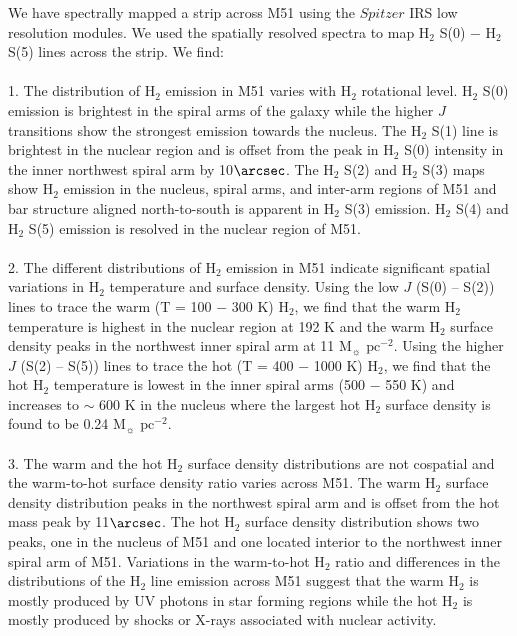 \documentclass[12pt,preprint]{aastex}
\begin{document}
We have spectrally mapped a strip across M51 using the $Spitzer$ IRS
low resolution modules.  We used the spatially resolved spectra to map
H$_2$ S(0) $-$ H$_2$ S(5) lines across
the strip.  We find:\\
\\
1.  The distribution of H$_2$
emission in M51 varies with H$_2$ rotational level.
H$_2$ S(0) emission is brightest in the spiral arms of the
galaxy while the higher $J$ transitions show the strongest emission
towards the nucleus.  The H$_2$ S(1) line is brightest
in the nuclear region and is offset from the peak in H$_2$ S(0) 
intensity in the inner northwest spiral arm by 10$\arcsec$.
The H$_2$ S(2) and H$_2$ S(3) maps show
H$_2$ emission in the nucleus, spiral arms, and inter-arm
regions of M51 and bar structure aligned north-to-south is apparent in
H$_2$ S(3) emission.  H$_2$ S(4) and H$_2$
S(5) emission is resolved in the nuclear region of M51.\\
\\
2.  The different distributions of H$_2$ emission in M51
indicate significant spatial variations in H$_2$
temperature and surface density.  Using the low $J$ (S(0) -- S(2)) lines to trace the warm (T = 100
$-$ 300 K) H$_2$, we find that the warm H$_2$
temperature is highest in the nuclear region at 192 K and
the warm H$_2$ surface density peaks in the northwest inner spiral arm
at 11 $\mathrm{M_\sun}$ $\mathrm{pc^{-2}}$.  Using the
higher $J$ (S(2) -- S(5)) lines to trace the hot (T = 400 $-$ 1000 K) H$_2$,
we find that the hot H$_2$ temperature is lowest
in the inner spiral arms (500 $-$ 550 K) and increases to $\sim$ 600 K
in the nucleus where the largest hot H$_2$ surface density
is found to be 0.24 $\mathrm{M_\sun}$ $\mathrm{pc^{-2}}$.\\
\\
3.  The warm and the hot H$_2$ surface density distributions are not
cospatial and the warm-to-hot surface density ratio varies across M51.  The warm
H$_2$ surface density distribution peaks in the northwest spiral arm and is offset from
the hot mass peak by 11$\arcsec$.  The hot H$_2$ surface density distribution 
shows two peaks, one in the nucleus of M51 and one located interior to the 
northwest inner spiral arm of M51.  Variations in the
warm-to-hot H$_2$ ratio and differences in the
distributions of the H$_2$ line emission across 
M51 suggest that the warm H$_2$ is mostly produced 
by UV photons in star forming regions while the hot H$_2$ is 
mostly produced by shocks or X-rays associated with nuclear activity.\\
\end{document}
